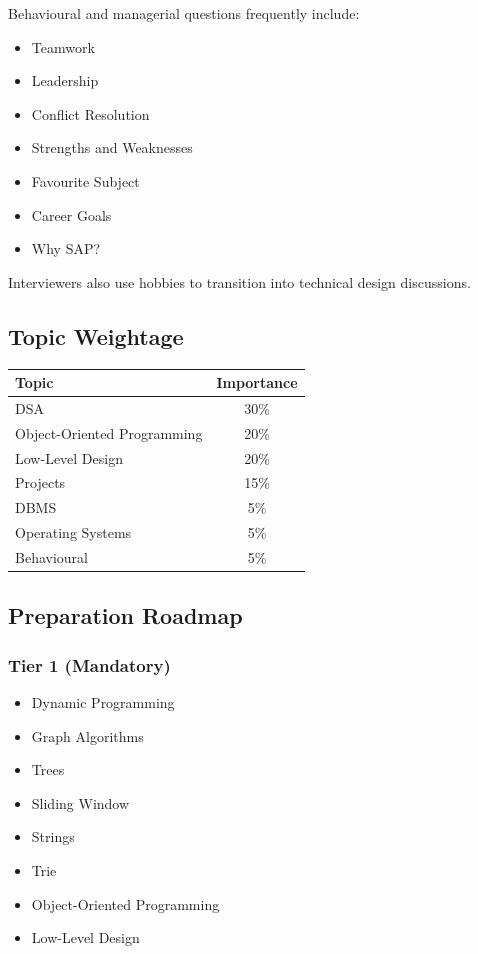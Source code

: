 \documentclass[11pt,a4paper]{article}
\begin{document}
Behavioural and managerial questions frequently include:

\begin{itemize}
	\item Teamwork
	\item Leadership
	\item Conflict Resolution
	\item Strengths and Weaknesses
	\item Favourite Subject
	\item Career Goals
	\item Why SAP?
\end{itemize}

Interviewers also use hobbies to transition into technical design discussions.


\subsection{Topic Weightage}

\begin{center}
	\begin{tabular}{|l|c|}
		\hline
		Topic & Importance \\
		\hline
		DSA & 30\% \\
		Object-Oriented Programming & 20\% \\
		Low-Level Design & 20\% \\
		Projects & 15\% \\
		DBMS & 5\% \\
		Operating Systems & 5\% \\
		Behavioural & 5\% \\
		\hline
	\end{tabular}
\end{center}


\subsection{Preparation Roadmap}

\subsubsection{Tier 1 (Mandatory)}

\begin{itemize}
	\item Dynamic Programming
	\item Graph Algorithms
	\item Trees
	\item Sliding Window
	\item Strings
	\item Trie
	\item Object-Oriented Programming
	\item Low-Level Design
\end{itemize}
\end{document}
